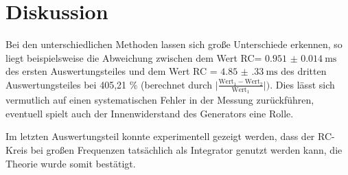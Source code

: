 \section{Diskussion}
\label{sec:Diskussion}
Bei den unterschiedlichen Methoden lassen sich große Unterschiede erkennen, so
liegt beispielsweise die Abweichung zwischen dem Wert RC=
$ \SI{0.951(14)}{\milli\second} $ des ersten Auswertungsteiles und dem Wert
RC = $ \SI{4.85(33)}{\milli\second} $ des dritten Auswertungsteiles bei 405,21
\% (berechnet durch $\lvert\frac{\text{Wert}_1-\text{Wert}_2}{\text{Wert}_1}\rvert)$.
Dies lässt sich vermutlich auf einen systematischen Fehler in der Messung zurückführen,
eventuell spielt auch der Innenwiderstand des Generators eine Rolle.

Im letzten Auswertungsteil konnte experimentell gezeigt werden, dass der RC-Kreis
bei großen Frequenzen tatsächlich als Integrator genutzt werden kann, die Theorie
wurde somit bestätigt.
